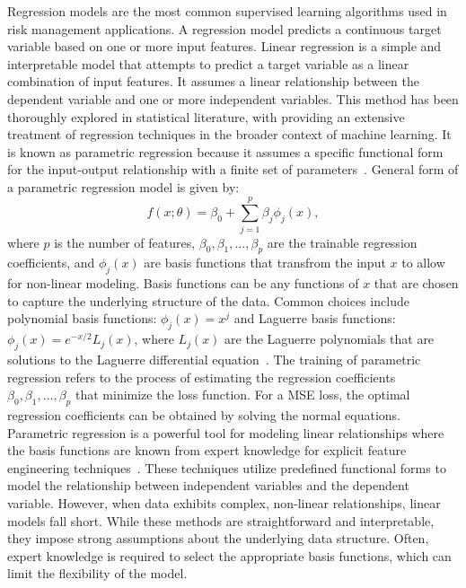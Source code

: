Regression models are the most common supervised learning algorithms used in risk management applications.
A regression model predicts a continuous target variable based on one or more input features.
Linear regression is a simple and interpretable model that attempts to predict a target variable as a linear combination of input features. 
It assumes a linear relationship between the dependent variable and one or more independent variables. 
This method has been thoroughly explored in statistical literature, with \citet{bishop2006pattern} providing an extensive treatment of regression techniques in the broader context of machine learning.
It is known as parametric regression because it assumes a specific functional form for the input-output relationship with a finite set of parameters~\citep{seber2012linear}.
General form of a parametric regression model is given by:
\begin{equation} \label{eq:regression}
    f(x; \theta) = \beta_0 + \sum_{j=1}^{p} \beta_j \phi_j(x),
\end{equation}
where $p$ is the number of features, $\beta_0, \beta_1, \ldots, \beta_p$ are the trainable regression coefficients, and $\phi_j(x)$ are basis functions that transfrom the input $x$ to allow for non-linear modeling.
Basis functions can be any functions of $x$ that are chosen to capture the underlying structure of the data.
Common choices include polynomial basis functions: $\phi_j(x) = x^j$ and Laguerre basis functions: $\phi_j(x) = e^{-x/2} L_j(x)$, where $L_j(x)$ are the Laguerre polynomials that are solutions to the Laguerre differential equation~\citep{szeg1939orthogonal}.
The training of parametric regression refers to the process of estimating the regression coefficients $\beta_0, \beta_1, \ldots, \beta_p$ that minimize the loss function.
For a MSE loss, the optimal regression coefficients can be obtained by solving the normal equations.
Parametric regression is a powerful tool for modeling linear relationships where the basis functions are known from expert knowledge for explicit feature engineering techniques~\citep{hastie2009elements}.
These techniques utilize predefined functional forms to model the relationship between independent variables and the dependent variable. 
However, when data exhibits complex, non-linear relationships, linear models fall short. 
While these methods are straightforward and interpretable, they impose strong assumptions about the underlying data structure.
Often, expert knowledge is required to select the appropriate basis functions, which can limit the flexibility of the model.
